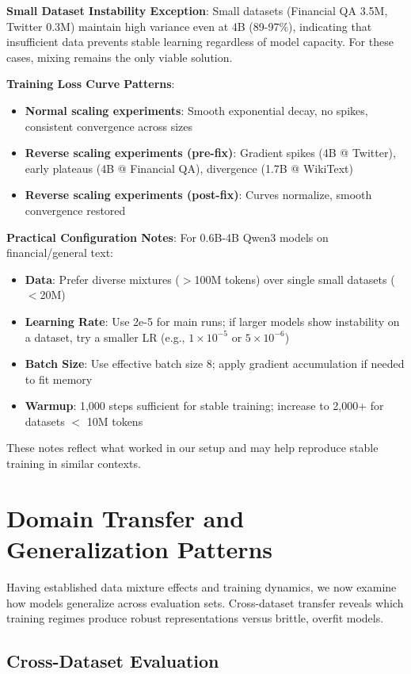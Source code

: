 \textbf{Small Dataset Instability Exception}: Small datasets (Financial QA 3.5M, Twitter 0.3M) maintain high variance even at 4B (89-97\%), indicating that insufficient data prevents stable learning regardless of model capacity. For these cases, mixing remains the only viable solution.

\textbf{Training Loss Curve Patterns}:
\begin{itemize}
\item \textbf{Normal scaling experiments}: Smooth exponential decay, no spikes, consistent convergence across sizes
\item \textbf{Reverse scaling experiments (pre-fix)}: Gradient spikes (4B @ Twitter), early plateaus (4B @ Financial QA), divergence (1.7B @ WikiText)
\item \textbf{Reverse scaling experiments (post-fix)}: Curves normalize, smooth convergence restored
\end{itemize}

\textbf{Practical Configuration Notes}: For 0.6B-4B Qwen3 models on financial/general text:
\begin{itemize}
\item \textbf{Data}: Prefer diverse mixtures ($>$100M tokens) over single small datasets ($<$20M)
\item \textbf{Learning Rate}: Use 2e-5 for main runs; if larger models show instability on a dataset, try a smaller LR (e.g., $1\times10^{-5}$ or $5\times10^{-6}$)
\item \textbf{Batch Size}: Use effective batch size 8; apply gradient accumulation if needed to fit memory
\item \textbf{Warmup}: 1,000 steps sufficient for stable training; increase to 2,000+ for datasets $<$ 10M tokens
\end{itemize}

These notes reflect what worked in our setup and may help reproduce stable training in similar contexts.

\section{Domain Transfer and Generalization Patterns}

Having established data mixture effects and training dynamics, we now examine how models generalize across evaluation sets. Cross-dataset transfer reveals which training regimes produce robust representations versus brittle, overfit models.

\subsection{Cross-Dataset Evaluation}

